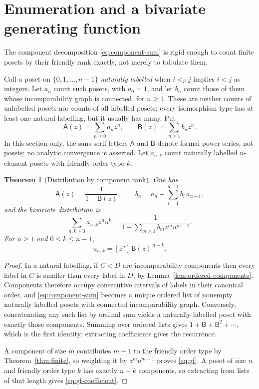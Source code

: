 \documentclass[11pt,letterpaper]{article}
\newtheorem{theorem}{Theorem}[section]
\theoremstyle{definition}
\theoremstyle{remark}
\newcommand{\gfA}{\mathsf{A}}
\newcommand{\gfB}{\mathsf{B}}
\begin{document}
\section{Enumeration and a bivariate generating function}\label{sec:enumeration}

The component decomposition \eqref{eq:component-sum} is rigid enough to
count finite posets by their friendly rank exactly, not merely to tabulate
them.

Call a poset on $\{0,1,\ldots,n-1\}$ \emph{naturally labelled} when
$i<_Pj$ implies $i<j$ as integers. Let $a_n$ count such posets, with
$a_0=1$, and let $b_n$ count those of them whose incomparability graph is
connected, for $n\ge1$. These are neither counts of unlabelled posets nor
counts of all labelled posets: every isomorphism type has at least one
natural labelling, but it usually has many. Put
\[
 \gfA(z)=\sum_{n\ge0}a_nz^n,
 \qquad
 \gfB(z)=\sum_{n\ge1}b_nz^n.
\]
In this section only, the sans-serif letters $\gfA$ and $\gfB$ denote formal
power series, not posets; no analytic convergence is asserted. Let $a_{n,k}$
count naturally labelled $n$-element posets with friendly order type $k$.

\begin{theorem}[Distribution by component rank]\label{thm:gf}
One has
\begin{equation}\label{eq:gf-univariate}
 \gfA(z)=\frac{1}{1-\gfB(z)},
 \qquad
 b_n=a_n-\sum_{i=1}^{n-1}b_i\,a_{n-i},
\end{equation}
and the bivariate distribution is
\begin{equation}\label{eq:gf}
 \boxed{\sum_{n,k\ge0}a_{n,k}z^nu^k
 =\frac{1}{1-\sum_{m\ge1}b_mz^mu^{m-1}}.}
\end{equation}
For $n\ge1$ and $0\le k\le n-1$,
\begin{equation}\label{eq:gf-coefficient}
 a_{n,k}=[z^n]\,\gfB(z)^{\,n-k}.
\end{equation}
\end{theorem}
\begin{proof}
In a natural labelling, if $C<D$ are incomparability components then every
label in $C$ is smaller than every label in $D$, by
Lemma~\ref{lem:ordered-components}. Components therefore occupy consecutive
intervals of labels in their canonical order, and
\eqref{eq:component-sum} becomes a unique ordered list of nonempty naturally
labelled posets with connected incomparability graph. Conversely,
concatenating any such list by ordinal sum yields a naturally labelled poset
with exactly those components. Summing over ordered lists gives
$1+\gfB+\gfB^2+\cdots$, which is the first identity; extracting coefficients
gives the recurrence.

A component of size $m$ contributes $m-1$ to the friendly order type by
Theorem~\ref{thm:finite}, so weighting it by $z^mu^{m-1}$ proves
\eqref{eq:gf}. A poset of size $n$ and friendly order type $k$ has exactly
$n-k$ components, so extracting from lists of that length gives
\eqref{eq:gf-coefficient}.
\end{proof}
\end{document}
